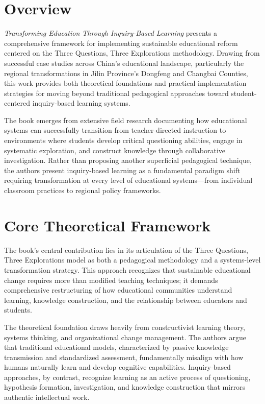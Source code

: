 \documentclass[
  Letterpaper,
]{scrbook}
\begin{document}
\section{Overview}\label{overview}

\emph{Transforming Education Through Inquiry-Based Learning} presents a
comprehensive framework for implementing sustainable educational reform
centered on the Three Questions, Three Explorations methodology. Drawing
from successful case studies across China's educational landscape,
particularly the regional transformations in Jilin Province's Dongfeng
and Changbai Counties, this work provides both theoretical foundations
and practical implementation strategies for moving beyond traditional
pedagogical approaches toward student-centered inquiry-based learning
systems.

The book emerges from extensive field research documenting how
educational systems can successfully transition from teacher-directed
instruction to environments where students develop critical questioning
abilities, engage in systematic exploration, and construct knowledge
through collaborative investigation. Rather than proposing another
superficial pedagogical technique, the authors present inquiry-based
learning as a fundamental paradigm shift requiring transformation at
every level of educational systems---from individual classroom practices
to regional policy frameworks.

\section{Core Theoretical Framework}\label{core-theoretical-framework}

The book's central contribution lies in its articulation of the Three
Questions, Three Explorations model as both a pedagogical methodology
and a systems-level transformation strategy. This approach recognizes
that sustainable educational change requires more than modified teaching
techniques; it demands comprehensive restructuring of how educational
communities understand learning, knowledge construction, and the
relationship between educators and students.

The theoretical foundation draws heavily from constructivist learning
theory, systems thinking, and organizational change management. The
authors argue that traditional educational models, characterized by
passive knowledge transmission and standardized assessment,
fundamentally misalign with how humans naturally learn and develop
cognitive capabilities. Inquiry-based approaches, by contrast, recognize
learning as an active process of questioning, hypothesis formation,
investigation, and knowledge construction that mirrors authentic
intellectual work.
\end{document}
